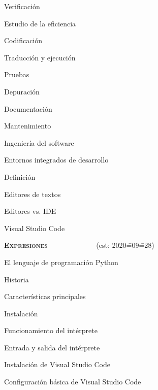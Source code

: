 \begin{longenum}
\begin{longenum}
\begin{longenum}
            \item Verificación
            \item Estudio de la eficiencia
            \item Codificación
            \item Traducción y ejecución
            \item Pruebas
            \item Depuración
            \item Documentación
            \item Mantenimiento
            \item Ingeniería del software
        \end{longenum}
        \item Entornos integrados de desarrollo
        \begin{longenum}
            \item Definición
            \item Editores de textos
            \item Editores vs. IDE
            \item Visual Studio Code
        \end{longenum}
    \end{longenum}
    \item \textbf{\textsc{Expresiones}} \ \ \ \ \ \ \ \ \ \ \ \ \ (est: 2020\==09\==28)
    \begin{longenum}
        \item El lenguaje de programación Python
        \begin{longenum}
            \item Historia
            \item Características principales
            \item Instalación
            \item Funcionamiento del intérprete
            \begin{longenum}
                \item Entrada y salida del intérprete
            \end{longenum}
            \item Instalación de Visual Studio Code
            \begin{longenum}
                \item Configuración básica de Visual Studio Code
            \end{longenum}
        \end{longenum}

\end{longenum}
\end{longenum}
